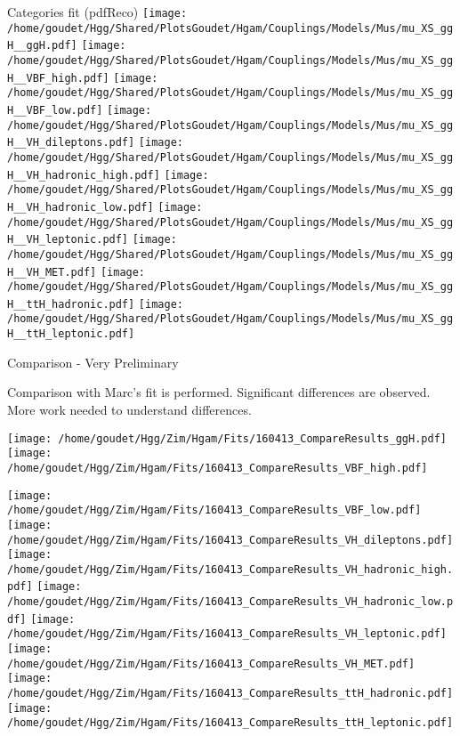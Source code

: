 \documentclass[a4paper]{beamer}
\begin{document}
\begin{frame}{Categories fit (pdfReco)}
  \texttt{[image: /home/goudet/Hgg/Shared/PlotsGoudet/Hgam/Couplings/Models/Mus/mu\_XS\_ggH\_\_ggH.pdf]}
  \texttt{[image: /home/goudet/Hgg/Shared/PlotsGoudet/Hgam/Couplings/Models/Mus/mu\_XS\_ggH\_\_VBF\_high.pdf]}
  \texttt{[image: /home/goudet/Hgg/Shared/PlotsGoudet/Hgam/Couplings/Models/Mus/mu\_XS\_ggH\_\_VBF\_low.pdf]}
  \texttt{[image: /home/goudet/Hgg/Shared/PlotsGoudet/Hgam/Couplings/Models/Mus/mu\_XS\_ggH\_\_VH\_dileptons.pdf]}
  \newline
  \texttt{[image: /home/goudet/Hgg/Shared/PlotsGoudet/Hgam/Couplings/Models/Mus/mu\_XS\_ggH\_\_VH\_hadronic\_high.pdf]}
  \texttt{[image: /home/goudet/Hgg/Shared/PlotsGoudet/Hgam/Couplings/Models/Mus/mu\_XS\_ggH\_\_VH\_hadronic\_low.pdf]}
  \texttt{[image: /home/goudet/Hgg/Shared/PlotsGoudet/Hgam/Couplings/Models/Mus/mu\_XS\_ggH\_\_VH\_leptonic.pdf]}
  \texttt{[image: /home/goudet/Hgg/Shared/PlotsGoudet/Hgam/Couplings/Models/Mus/mu\_XS\_ggH\_\_VH\_MET.pdf]}
  \newline
  \texttt{[image: /home/goudet/Hgg/Shared/PlotsGoudet/Hgam/Couplings/Models/Mus/mu\_XS\_ggH\_\_ttH\_hadronic.pdf]}
  \texttt{[image: /home/goudet/Hgg/Shared/PlotsGoudet/Hgam/Couplings/Models/Mus/mu\_XS\_ggH\_\_ttH\_leptonic.pdf]}
\end{frame}

\begin{frame}{Comparison - Very Preliminary }
  \begin{minipage}{0.49\linewidth}
    Comparison with Marc's fit is performed.
    Significant differences are observed. 
    More work needed to understand differences.
  \end{minipage}
  \hfill
  \begin{minipage}{0.49\linewidth}
    \texttt{[image: /home/goudet/Hgg/Zim/Hgam/Fits/160413\_CompareResults\_ggH.pdf]}
    \texttt{[image: /home/goudet/Hgg/Zim/Hgam/Fits/160413\_CompareResults\_VBF\_high.pdf]}
  \end{minipage}

  \texttt{[image: /home/goudet/Hgg/Zim/Hgam/Fits/160413\_CompareResults\_VBF\_low.pdf]}
  \texttt{[image: /home/goudet/Hgg/Zim/Hgam/Fits/160413\_CompareResults\_VH\_dileptons.pdf]}
  \texttt{[image: /home/goudet/Hgg/Zim/Hgam/Fits/160413\_CompareResults\_VH\_hadronic\_high.pdf]}
  \texttt{[image: /home/goudet/Hgg/Zim/Hgam/Fits/160413\_CompareResults\_VH\_hadronic\_low.pdf]}
  \newline
  \texttt{[image: /home/goudet/Hgg/Zim/Hgam/Fits/160413\_CompareResults\_VH\_leptonic.pdf]}
  \texttt{[image: /home/goudet/Hgg/Zim/Hgam/Fits/160413\_CompareResults\_VH\_MET.pdf]}
  \texttt{[image: /home/goudet/Hgg/Zim/Hgam/Fits/160413\_CompareResults\_ttH\_hadronic.pdf]}
  \texttt{[image: /home/goudet/Hgg/Zim/Hgam/Fits/160413\_CompareResults\_ttH\_leptonic.pdf]}
\end{frame}
\end{document}
